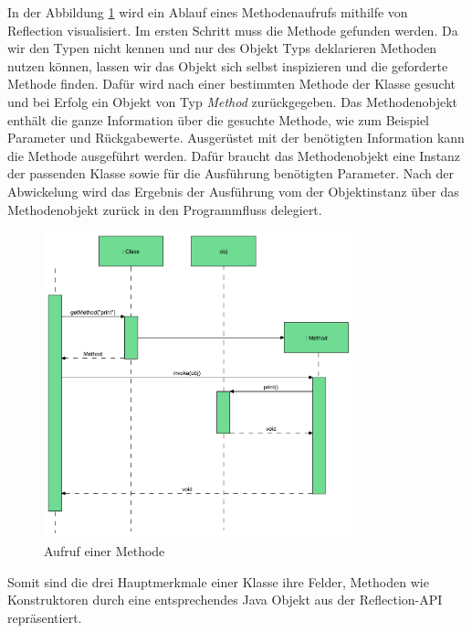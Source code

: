   In der Abbildung \ref{fig:refl-fluss} wird ein Ablauf eines Methodenaufrufs mithilfe von Reflection visualisiert. Im ersten Schritt muss die Methode gefunden werden. Da wir den Typen nicht kennen und nur des Objekt Typs deklarieren Methoden nutzen können, lassen wir das Objekt sich selbst inspizieren und die geforderte Methode finden. Dafür wird nach einer bestimmten Methode der Klasse gesucht und bei Erfolg ein Objekt von Typ \textit{Method} zurückgegeben. \newline
  Das Methodenobjekt enthält die ganze Information über die gesuchte Methode, wie zum Beispiel Parameter und Rückgabewerte. Ausgerüstet mit der benötigten Information kann die Methode ausgeführt werden. Dafür braucht das Methodenobjekt eine Instanz der passenden Klasse sowie für die Ausführung benötigten Parameter. Nach der Abwickelung wird das Ergebnis der Ausführung vom der Objektinstanz über das Methodenobjekt zurück in den Programmfluss delegiert. \cite{Forman04javareflection}

  \begin{figure}[h!]
    \centering
    \includegraphics[width=0.8\textwidth]{material/images/flussReflection.pdf}
    \caption{Aufruf einer Methode \cite{Forman04javareflection}}
    \label{fig:refl-fluss}
  \end{figure}

  \newpage Somit sind die drei Hauptmerkmale einer Klasse ihre Felder, Methoden wie Konstruktoren durch eine entsprechendes Java Objekt aus der Reflection-API repräsentiert. 


